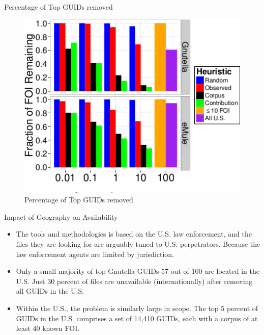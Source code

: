 \documentclass[notes]{beamer}
\begin{document}
\begin{frame}

\begin{block}{Percentage of Top GUIDs removed}

\begin{figure}[!htb]
\centering
\includegraphics[scale=0.5]{Top_GUIDs_Removed}
\caption{Percentage of Top GUIDs removed}
\label{fig:Top_GUIDs_Removed}
\end{figure}

\end{block}

\end{frame}


\begin{frame}
\begin{block}{Impact of Geography on Availability}
\begin{itemize}
\item[\checkmark] The tools and methodologies is based on the U.S. law enforcement, and the files they are looking for are arguably tuned to U.S. perpetrators. Because the law enforcement agents are limited by jurisdiction.
\item[\checkmark] Only a small majority of top Gnutella GUIDs 57 out of 100 are located in the U.S. Just 30 percent of files are unavailable (internationally) after removing all GUIDs in the U.S.
\item[\checkmark] Within the U.S., the problem is similarly large in scope. The top 5 percent of GUIDs in the U.S. comprises a set of 14,410 GUIDs, each with a corpus of at least 40 known FOI. 

\end{itemize}
\end{block}
\end{frame}
\end{document}
